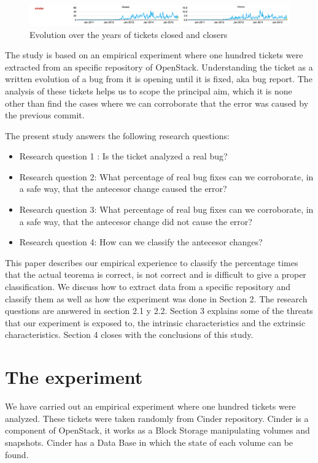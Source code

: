 \documentclass[a4paper]{article}
\begin{document}
\begin{figure}[htb]
\centering
\includegraphics[width=1\textwidth]{cinder}
\caption{Evolution over the years of tickets closed and closers   } \label{fig:cinder}
\end{figure}

The study is based on an empirical experiment where one hundred tickets were extracted from an specific repository of OpenStack. Understanding the ticket as a written evolution of a bug from it is opening until it is fixed, aka bug report. The analysis of these tickets helps us to scope the principal aim, which it is none other than find the cases where we can corroborate that the error was caused by the previous commit. 

The present study answers the following research questions:
\begin{itemize}
	\item Research question 1 : Is the ticket analyzed a real bug? 
	\item Research question 2: What percentage of real bug fixes can we corroborate, in a safe way, that the antecesor change caused the error? 
	\item Research question 3: What percentage of real bug fixes can we corroborate, in a safe way, that the antecesor change did not cause the error? 
	\item Research question 4: How can we classify the antecesor changes? 
\end{itemize}

This paper describes our empirical experience to classify the percentage times that the actual
teorema is correct, is not correct and is difficult to give a proper classification. We discuss how to extract data from a specific repository and classify them as well as how the experiment was done in Section 2. The research questions are answered in section 2.1 y 2.2. Section 3 explains some of the threats that our experiment is exposed to, the intrinsic characteristics and the extrinsic characteristics. Section 4 closes with the conclusions of this study. 
\section{The experiment}

We have carried out an empirical experiment where one hundred tickets were analyzed. These tickets were taken randomly from Cinder repository. Cinder is a component of OpenStack, it works as a Block Storage manipulating volumes and snapshots. Cinder has a Data Base in which the state of each volume can be found. 
\end{document}
